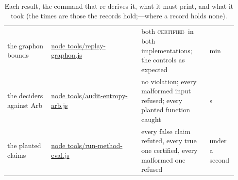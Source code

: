 \documentclass[preprint,11pt,authoryear,a4paper]{elsarticle}
\newcommand{\vword}[1]{{\normalfont\scshape #1}}
\newcommand{\vC}{\vword{certified}}
\begin{document}
\begin{table}[h]
\begin{tabular}{@{}L{0.18\linewidth}L{0.37\linewidth}L{0.29\linewidth}L{0.10\linewidth}@{}}
the graphon bounds & \url{node tools/replay-graphon.js} & both \vC\ in both implementations; the controls as expected & \OcGnMinutes{} min \\
the deciders against Arb & \url{node tools/audit-entropy-arb.js} & no violation; every malformed input refused; every planted function caught & \MtEaSeconds{} s \\
the planted claims & \url{node tools/run-method-eval.js} & every false claim refuted, every true one certified, every malformed one refused & under a second \\
\bottomrule\end{tabular}
\caption{Each result, the command that re-derives it, what it must print, and what it took (the times are those the records hold;---where a record holds none).}\label{tab:repro}
\end{table}



\end{document}
